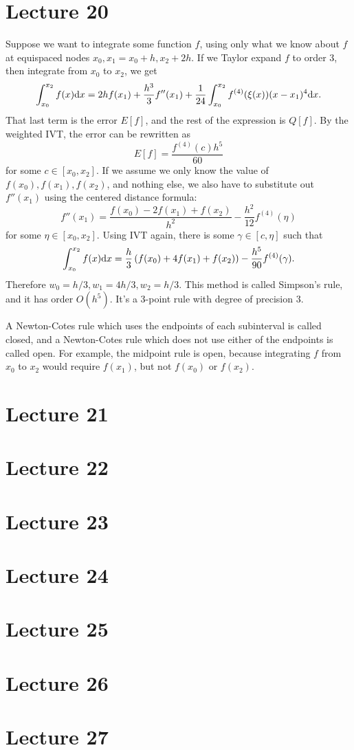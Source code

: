 \documentclass{article}
\begin{document}
\section{Lecture 20}
Suppose we want to integrate some function $f$, using only what we know about $f$ at equispaced nodes $x_0, x_1 = x_0+h, x_2+2h$. If we Taylor expand $f$ to order 3, then integrate from $x_0$ to $x_2$, we get
\[ \int_{x_0}^{x_2} f(x) \mathrm{d} x = 2hf(x_1) + \frac{h^3}{3} f''(x_1) + \frac{1}{24} \int_{x_0}^{x_2} f^{(4)}(\xi(x))(x-x_1)^4 \mathrm{d} x. \]
That last term is the error $E[f]$, and the rest of the expression is $Q[f]$. By the weighted IVT, the error can be rewritten as
\[ E[f] = \frac{f^{(4)}(c)h^5}{60} \]
for some $c \in [x_0, x_2]$. If we assume we only know the value of $f(x_0), f(x_1), f(x_2)$, and nothing else, we also have to substitute out $f''(x_1)$ using the centered distance formula:
\[ f''(x_1) = \frac{f(x_0)-2f(x_1)+f(x_2)}{h^2} - \frac{h^2}{12} f^{(4)}(\eta) \]
for some $\eta \in [x_0, x_2]$. Using IVT again, there is some $\gamma \in [c, \eta]$ such that
\[ \int_{x_0}^{x_2} f(x)\mathrm{d} x = \frac{h}{3} \left( f(x_0) +4f(x_1) +f(x_2) \right) - \frac{h^5}{90} f^{(4)}(\gamma). \]
Therefore $w_0=h/3, w_1=4h/3, w_2=h/3$. This method is called Simpson's rule, and it has order $O(h^5)$. It's a 3-point rule with degree of precision 3.
\par
A Newton-Cotes rule which uses the endpoints of each subinterval is called closed, and a Newton-Cotes rule which does not use either of the endpoints is called open. For example, the midpoint rule is open, because integrating $f$ from $x_0$ to $x_2$ would require $f(x_1)$, but not $f(x_0)$ or $f(x_2)$.

\section{Lecture 21}

\section{Lecture 22}

\section{Lecture 23}

\section{Lecture 24}

\section{Lecture 25}

\section{Lecture 26}

\section{Lecture 27}
\end{document}
